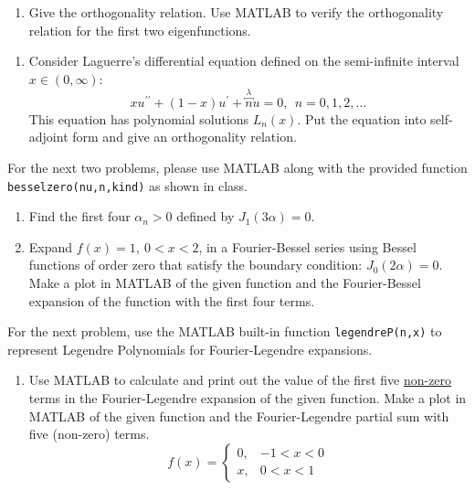 \begin{fullwidth}
\begin{enumerate}[resume]
\begin{enumerate}
\vspace{0.5cm}

\item Give the orthogonality relation.  Use MATLAB to verify the orthogonality relation for the first two eigenfunctions.
\end{enumerate}

\end{enumerate}

\vspace{0.75cm}

\begin{enumerate}[resume]
\item Consider Laguerre's differential equation defined on the semi-infinite interval $x \in (0,\infty)$:
\begin{equation*}
xu^{\prime \prime} + (1-x)u^{\prime} + \overbracket{n}^{\lambda} u = 0, \ \ n = 0,1,2,\dots
\end{equation*}
This equation has polynomial solutions $L_{n}(x).$  Put the equation into self-adjoint form and give an orthogonality relation.
\end{enumerate}

\vspace{1.0cm}

\noindent For the next two problems, please use MATLAB along with the provided function \lstinline[style=myMatlab]{besselzero(nu,n,kind)} as shown in class.

\begin{enumerate}[resume]
\item Find the first four $\alpha_n > 0$ defined by $J_1(3\alpha) = 0$.

\vspace{1.0cm}

\item Expand $f(x)=1, \ 0<x<2$, in a Fourier-Bessel series using Bessel functions of order zero that satisfy the boundary condition: $J_0(2\alpha) = 0$.  Make a plot in MATLAB of the given function and the Fourier-Bessel expansion of the function with the first four terms.


\end{enumerate}

\vspace{1.0cm}

\noindent For the next problem, use the MATLAB built-in function \lstinline[style=myMATLAB]{legendreP(n,x)} to represent Legendre Polynomials for Fourier-Legendre expansions.
\begin{enumerate}[resume]
\item Use MATLAB to calculate and print out the value of the first five \underline{non-zero} terms in the Fourier-Legendre expansion of the given function.  Make a plot in MATLAB of the given function and the Fourier-Legendre partial sum with five (non-zero) terms.
\begin{equation*}
f(x) = 
\begin{cases}
0, & -1 < x < 0 \\
x, & 0 < x < 1
\end{cases}
\end{equation*}
\end{enumerate}

\end{fullwidth}
